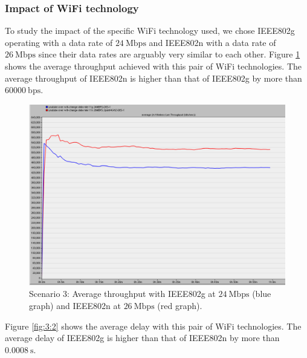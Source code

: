 \subsubsection{Impact of WiFi technology} \label{subsub:3:wifi}
To study the impact of the specific \gls{WiFi} technology used, we chose \gls{IEEE802}g operating with a data rate of $24~\mathrm{Mbps}$ and \gls{IEEE802}n with a data rate of $26~\mathrm{Mbps}$ since their data rates are arguably very similar to each other. Figure \ref{fig:3:1} shows the average throughput achieved with this pair of \gls{WiFi} technologies. The average throughput of \gls{IEEE802}n is higher than that of \gls{IEEE802}g by more than $60000~\mathrm{bps}$.

\begin{figure}[H]
	\centering
	\includegraphics[scale=0.28]{Figures/amantianrenamed/Scen3AveThroughofg24Mn26M.png}
	\caption[Scenario 3: average throughput according to the WiFi technology used]{Scenario 3: Average throughput with \gls{IEEE802}g at $24~\mathrm{Mbps}$ (blue graph) and \gls{IEEE802}n at $26~\mathrm{Mbps}$ (red graph).}
	\label{fig:3:1}
\end{figure}

Figure \ref{fig:3:2} shows the average delay with this pair of \gls{WiFi} technologies. The average delay of \gls{IEEE802}g is higher than that of \gls{IEEE802}n by more than $0.0008~\mathrm{s}$.

